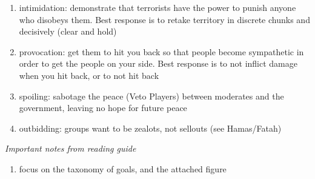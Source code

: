 \documentclass{article}
\begin{document}
\begin{itemize}
\begin{enumerate}
        \item intimidation: demonstrate that terrorists have the power to punish anyone who disobeys them. Best response is to retake territory in discrete chunks and decisively (clear and hold)
        \item provocation: get them to hit you back so that people become sympathetic in order to get the people on your side. Best response is to not inflict damage when you hit back, or to not hit back
        \item spoiling: sabotage the peace (Veto Players) between moderates and the government, leaving no hope for future peace
        \item outbidding: groups want to be zealots, not sellouts (see Hamas/Fatah)
    \end{enumerate}
\end{itemize}
\textit{Important notes from reading guide}
\begin{enumerate}
    \item focus on the taxonomy of goals, and the attached figure
\end{enumerate}
\end{document}
